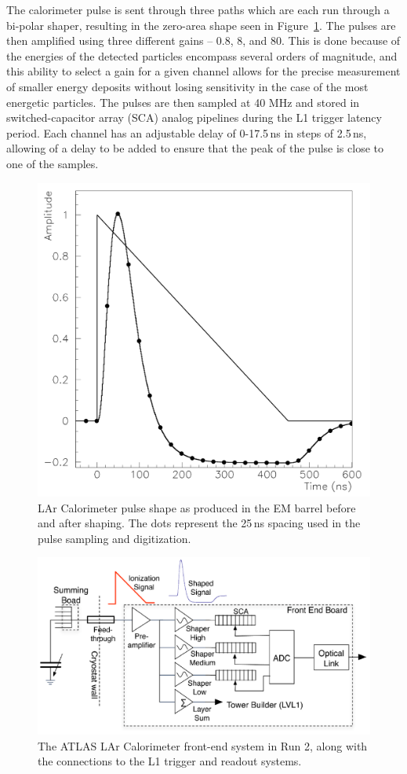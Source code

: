 The calorimeter pulse is sent through three paths which are each run through a bi-polar shaper, resulting in the zero-area shape seen in Figure~\ref{fig:LArPulse}.  The pulses are then amplified using three different gains -- 0.8, 8, and 80.  This is done because of the energies of the detected particles encompass several orders of magnitude, and this ability to select a gain for a given channel allows for the precise measurement of smaller energy deposits without losing sensitivity in the case of the most energetic particles.  The pulses are then sampled at 40 MHz and stored in switched-capacitor array (SCA) analog pipelines during the L1 trigger latency period.  Each channel has an adjustable delay of 0-17.5\,ns in steps of 2.5\,ns, allowing of a delay to be added to ensure that the peak of the pulse is close to one of the samples.

\begin{figure}[h]
	\centering
	\includegraphics[width=0.5\columnwidth]{figures/Detector/LArPulse.png}
	\caption{LAr Calorimeter pulse shape as produced in the EM barrel before and after shaping.  The dots represent the 25\,ns spacing used in the pulse sampling and digitization.\cite{LArDQ}
	}
	\label{fig:LArPulse}
\end{figure} 

\begin{figure}[]
	\centering
	\includegraphics[width=0.8\columnwidth]{figures/Detector/LArReadout.png}
	\caption{The ATLAS LAr Calorimeter front-end system in Run 2, along with the connections to the L1 trigger and readout systems.\cite{LAr_Performance}
	}
	\label{fig:LArOverview}
\end{figure} 

